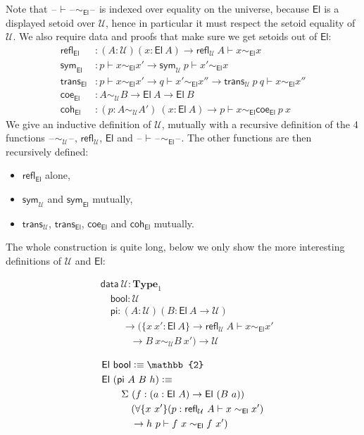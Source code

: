 \documentclass[autoref]{llncs}
\newcommand{\setoidU}{\mathcal{U}}
\newcommand{\mType}{\mathbf{Type}}
\newcommand{\El}{\textsf{El}}
\newcommand{\reflu}{\textsf{refl}_\setoidU}
\newcommand{\symu}{\textsf{sym}_\setoidU}
\newcommand{\transu}{\textsf{trans}_\setoidU}
\newcommand{\coeel}{\textsf{coe}_\El}
\newcommand{\cohel}{\textsf{coh}_\El}
\newcommand{\equ}[2]{#1 \sim_\setoidU #2}
\newcommand{\eqel}[3]{#1 \vdash #2 \sim_\El #3}
\providecommand\mathbbm{\mathbb}
\newcommand{\blank}{\mathord{\hspace{1pt}\text{--}\hspace{1pt}}}
\newcommand{\defeq}{\mathrel{\vcentcolon\equiv}}
\begin{document}
Note that $\eqel{\blank}{\blank}{\blank}$ is indexed over equality on the universe, because
$\El$ is a displayed setoid over $\setoidU$, hence in particular it must respect the setoid
equality of $\setoidU$.
%
We also require data and proofs that make sure we get setoids out of $\El$:
\begin{align*}
  \textsf{refl}_\El &: (A : \setoidU) (x : \El\ A) \to \eqel{\reflu\ A}{x}{x} \\
  \textsf{sym}_\El &: \eqel{p}{x}{x'} \to \eqel{\symu\ p}{x'}{x} \\
  \textsf{trans}_\El &: \eqel{p}{x}{x'} \to \eqel{q}{x'}{x''} \to \eqel{\transu\ p\ q}{x}{x''} \\
  \coeel &: \equ{A}{B} \to \El\ A \to \El\ B \\
  \cohel &: (p : \equ{A}{A'}) \ (x : \El\ A) \to \eqel{p}{x}{\coeel\ p\ x}
\end{align*}
%
We give an inductive definition of $\setoidU$, mutually with a recursive definition
of the 4 functions
$\blank\sim_\setoidU\blank$, $\textsf{refl}_\setoidU$, $\El$ and $\blank\vdash\blank\sim_\El\blank$.
The other functions are then recursively defined:
\begin{itemize}
\item $\textsf{refl}_\El$ alone,
\item $\textsf{sym}_\setoidU$ and $\textsf{sym}_\El$ mutually,
\item $\textsf{trans}_\setoidU$, $\textsf{trans}_\El$, $\coeel$ and $\cohel$ mutually.
\end{itemize}
The whole construction is quite long, below we only show the more interesting
definitions of $\setoidU$ and $\El$: \\
\vspace{-0.2em}
\begin{minipage}{0.5\textwidth}
\begin{align*}
  & \textsf{data}\ \setoidU : \mType_1 \\
  & \quad \textsf{bool} : \setoidU \\
  & \quad \textsf{pi}
  :  (A : \setoidU) (B : \El\ A \to \setoidU)\\
  & \ \qquad \to (\{x\ x' : \El\ A\} \to \textsf{refl}_\setoidU\ A \vdash x \sim_\El x'\\
  & \qquad\quad \to B\ x \sim_\setoidU B\ x')
  \to \setoidU
\end{align*}
\end{minipage}
\begin{minipage}{0.5\textwidth}
\begin{align*}
  & \El\ \textsf{bool} \defeq \mathbbm{2} \\
  & \El\ (\textsf{pi}\ A\ B\ h) \defeq \\
  & \qquad \Sigma\ (f : (a : \El\ A) \to \El\ (B\ a)) \\
  & \qquad \quad
  (\forall\{x\ x'\}(p : \eqel{\reflu\ A}{x}{x'}) \\
  & \qquad \quad\to \eqel{h\ p}{f\ x}{f\ x'})
\end{align*}
\end{minipage}
\\
\end{document}
